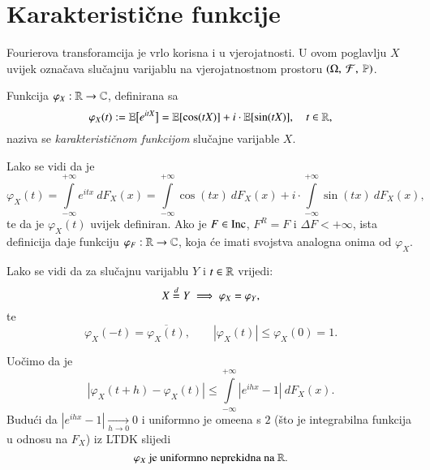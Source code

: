 
\chapter{Karakteristi\v cne funkcije}

Fourierova transforamcija je vrlo korisna i u vjerojatnosti.
U ovom poglavlju $X$ uvijek ozna\v cava slu\v cajnu varijablu na vjerojatnostnom prostoru $(\Omega, \: \mathcal{F}, \: \mathbb{P})$.

\begin{defn}    \label{def:17.1}
    Funkcija $\varphi_X :  \mathbb{R} \to \mathbb{C}$, definirana sa
    \begin{equation*}
        \varphi_X (t) := \mathbb{E} \big[ e^{itX} \big] = \mathbb{E}[\cos (tX)] + i \cdot \mathbb{E} [ \sin (tX) ], \quad t \in \mathbb{R},
    \end{equation*}
    naziva se \emph{karakteristi\v cnom funkcijom} slu\v cajne varijable $X$.
\end{defn}

Lako se vidi da je
\begin{equation*}
    \varphi_X (t) = \int\limits_{-\infty}^{+\infty} e^{i t x} \: d F_X (x) = \int\limits_{-\infty}^{+ \infty} \cos (t x)  \: d F_X (x) + i \cdot \int\limits_{-\infty}^{+\infty} \sin (t x) \: d F_X (x),
\end{equation*}
te da je $\varphi_X (t)$ uvijek definiran.
Ako je $F \in \mathrm{Inc}$, $F^R = F$ i $\Delta F < +\infty$, ista definicija daje funkciju $\varphi_F : \mathbb{R} \to \mathbb{C}$, koja \' ce imati svojstva analogna onima od $\varphi_X$.

Lako se vidi da za slu\v cajnu varijablu $Y$ i $t \in \mathbb{R}$ vrijedi:
\begin{equation}    \label{jed:17.2}
    X \overset{d}{=} Y \implies \varphi_X = \varphi_Y,
\end{equation}
te
\begin{equation}    \label{jed:17.3}
    \varphi_X(-t) = \overline{\varphi_X (t)}, \quad \quad |\varphi_X (t)| \leq \varphi_X(0) = 1.
\end{equation}

Uo\v cimo da je
\begin{equation*}
    |\varphi_X (t+h) - \varphi_X(t)| \leq \int\limits_{-\infty}^{+\infty} |e^{i h x} - 1| \: d F_X (x).    
\end{equation*}
Budu\' ci da $|e^{i h x} -1| \xrightarrow[h \to 0]{} 0$ i uniformno je ome\dj ena s $2$ (\v sto je integrabilna funkcija u odnosu na $F_X$) iz LTDK slijedi
\begin{equation}    \label{jed:17.4}
    \varphi_X \textnormal{ je uniformno neprekidna na } \mathbb{R}.
\end{equation}

